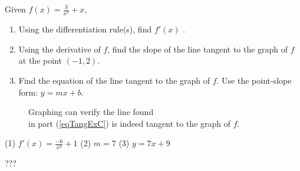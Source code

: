 \begin{example}
Given $f(x)=\displaystyle\frac{3}{x^2}+x$,
\renewcommand{\labelenumi}{(\arabic{enumi})}
\begin{enumerate}[leftmargin=*]
\item Using the differentiation rule(s), find $f'(x)$ .
\item Using the derivative of $f$, find the slope of the line tangent to the graph of $f$ at the point $(-1,2)$.
\item Find the equation of the line tangent to the graph of $f$. Use the point-slope form: $y=mx+b$.
\label{eqTangExC}
\end{enumerate}

\vspace{-0.5cm}
\begin{figure}[H]
  \hspace*{-9cm}
    \captionsetup{justification=justified,singlelinecheck=off }
        
    \caption{Graphing can verify the line found \\in part
          (\ref{eqTangExC}) is indeed tangent to the graph of $f$.}
    \label{fig:eqTangEx}
\end{figure}
    \begin{sol}
    (1) $f'(x)=\displaystyle\frac{-6}{x^3}+1$ (2) $m=7$ (3) $y=7x+9$
    \end{sol}
    \begin{solL}
    ???
    
    \end{solL}
    
\end{example}
\vspace{0.4in}
